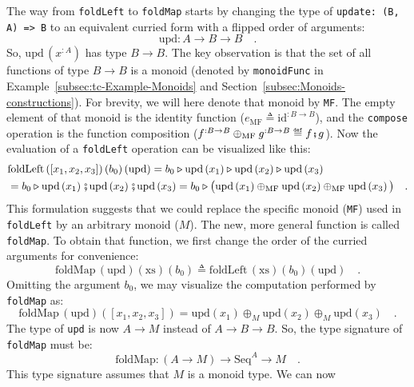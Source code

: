 The way from \lstinline!foldLeft! to \lstinline!foldMap! starts
by changing the type of \lstinline!update: (B, A) => B! to an equivalent
curried form with a flipped order of arguments:
\[
\text{upd}:A\rightarrow B\rightarrow B\quad.
\]
So, $\text{upd}\,(x^{:A})$ has type $B\rightarrow B$. The key observation
is that the set of all functions of type $B\rightarrow B$ is a monoid
(denoted by \lstinline!monoidFunc! in Example~\ref{subsec:tc-Example-Monoids}
and Section~\ref{subsec:Monoids-constructions}).
For brevity, we will here denote that monoid by \lstinline!MF!. The
empty element of that monoid is the identity function ($e_{\text{MF}}\triangleq\text{id}^{:B\rightarrow B}$),
and the \lstinline!compose! operation is the function composition
($f^{:B\rightarrow B}\oplus_{\text{MF}}g^{:B\rightarrow B}\triangleq f\bef g$).
Now the evaluation of a \lstinline!foldLeft! operation can be visualized
like this:
\begin{align*}
 & \text{foldLeft}\left(\left[x_{1},x_{2},x_{3}\right]\right)\left(b_{0}\right)\left(\text{upd}\right)=b_{0}\triangleright\text{upd}\left(x_{1}\right)\triangleright\text{upd}\left(x_{2}\right)\triangleright\text{upd}\left(x_{3}\right)\\
 & =b_{0}\triangleright\text{upd}\left(x_{1}\right)\bef\text{upd}\left(x_{2}\right)\bef\text{upd}\left(x_{3}\right)=b_{0}\triangleright\big(\text{upd}\left(x_{1}\right)\oplus_{\text{MF}}\text{upd}\left(x_{2}\right)\oplus_{\text{MF}}\text{upd}\left(x_{3}\right)\big)\quad.
\end{align*}
This formulation suggests that we could replace the specific monoid
(\lstinline!MF!) used in \lstinline!foldLeft! by an arbitrary monoid
($M$). The new, more general function is called \lstinline!foldMap!.
To obtain that function, we first change the order of the curried
arguments for convenience:
\[
\text{foldMap}\,(\text{upd})(\text{xs})\left(b_{0}\right)\triangleq\text{foldLeft}\,(\text{xs})\left(b_{0}\right)(\text{upd})\quad.
\]
Omitting the argument $b_{0}$, we may visualize the computation performed
by \lstinline!foldMap! as:
\[
\text{foldMap}\,(\text{upd})\left(\left[x_{1},x_{2},x_{3}\right]\right)=\text{upd}\left(x_{1}\right)\oplus_{M}\text{upd}\left(x_{2}\right)\oplus_{M}\text{upd}\left(x_{3}\right)\quad.
\]
The type of \lstinline!upd! is now $A\rightarrow M$ instead of $A\rightarrow B\rightarrow B$.
So, the type signature of \lstinline!foldMap! must be:
\[
\text{foldMap}:(A\rightarrow M)\rightarrow\text{Seq}^{A}\rightarrow M\quad.
\]
This type signature assumes that $M$ is a monoid type. We can now
